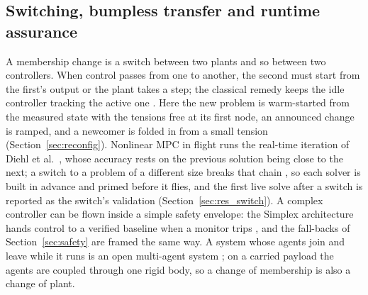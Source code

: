 
\subsection{Switching, bumpless transfer and runtime assurance}
\label{sec:lit_switching}

A membership change is a switch between two plants and so between two controllers. When control passes from one to
another, the second must start from the first's output or the plant takes a step; the classical remedy keeps the idle
controller tracking the active one \cite{graebe1996transfer, peng1996antiwindup}. Here the new problem is warm-started
from the measured state with the tensions free at its first node, an announced change is ramped, and a newcomer is
folded in from a small tension (Section~\ref{sec:reconfig}). Nonlinear MPC in flight runs the real-time iteration of
Diehl et al.\ \cite{diehl2002rti, verschueren2022acados}, whose accuracy rests on the previous solution being close to
the next; a switch to a problem of a different size breaks that chain \cite{gros2020rti}, so each solver is built in
advance and primed before it flies, and the first live solve after a switch is reported as the switch's validation
(Section~\ref{sec:res_switch}). A complex controller can be flown inside a simple safety envelope: the Simplex
architecture hands control to a verified baseline when a monitor trips \cite{sha2001simplicity}, and the fall-backs of
Section~\ref{sec:safety} are framed the same way. A system whose agents join and leave while it runs is an open
multi-agent system \cite{hendrickx2017open, sekercioglu2026open}; on a carried payload the agents are coupled through
one rigid body, so a change of membership is also a change of plant.
